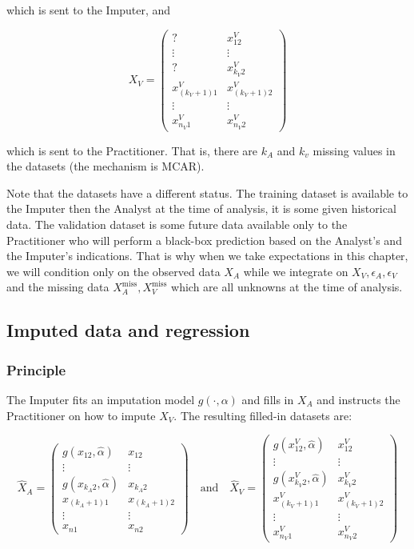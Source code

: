 which is sent to the Imputer, and

\begin{equation*}
X_V = 
\begin{pmatrix}
? & x_{12}^V \\
\vdots & \vdots \\
? & x_{k_V 2}^V \\
x_{(k_V+1)1}^V & x_{(k_V+1)2}^V\\
\vdots & \vdots \\
x_{n_V 1}^V & x_{n_V 2}^V
\end{pmatrix}
\end{equation*}

which is sent to the Practitioner. That is, there are $k_A$ and $k_v$ missing values in the datasets (the mechanism is MCAR).

Note that the datasets have a different status. The training dataset is available to the Imputer then the Analyst at the time of analysis, it is some given historical data. The validation dataset is some future data available only to the Practitioner who will perform a black-box prediction based on the Analyst's and the Imputer's indications. That is why when we take expectations in this chapter, we will condition only on the observed data $X_A$ while we integrate on $X_V, \epsilon_A, \epsilon_V$ and the missing data $X_A^{\text{miss}}, X_V^{\text{miss}}$ which are all unknowns at the time of analysis. 

		\subsection{Imputed data and regression}
			\subsubsection{Principle}
The Imputer fits an imputation model $g(\cdot, \alpha)$ and fills in $X_A$ and instructs the Practitioner on how to impute $X_V$. The resulting filled-in datasets are:

\begin{equation*}
\hat{X}_A = 
\begin{pmatrix}
g(x_{12},\hat{\alpha}) & x_{12} \\
\vdots & \vdots \\
g(x_{k_A 2},\hat{\alpha}) & x_{k_A 2} \\
x_{(k_A+1)1} & x_{(k_A+1)2}\\
\vdots & \vdots \\
x_{n 1} & x_{n 2}
\end{pmatrix}
\quad \mathrm{and} \quad
\hat{X}_V = 
\begin{pmatrix}
g(x_{12}^V,\hat{\alpha}) & x_{12}^V \\
\vdots & \vdots \\
g(x_{k_V 2}^V,\hat{\alpha}) & x_{k_V 2}^V \\
x_{(k_V+1)1}^V & x_{(k_V+1)2}^V\\
\vdots & \vdots \\
x_{n_V 1}^V & x_{n_V 2}^V
\end{pmatrix}
\end{equation*}

